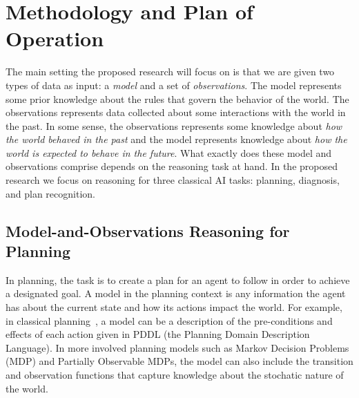 \documentclass[12pt]{article}
\begin{document}
\section{Methodology and Plan of Operation}
\label{sec:methodology}


The main setting the proposed research will focus on is that we are given two types of data as input: 
a {\em model} and a set of {\em observations}. The model represents some prior knowledge about the rules that govern the behavior of the world. The observations represents data collected about some  interactions with the world in the past. 
In some sense, the observations represents some knowledge about {\em how the world behaved in the past} and the model represents knowledge about {\em how the world is expected to behave in the future}. What exactly does these model and observations comprise depends on the reasoning task at hand. In the proposed research we focus on reasoning for three classical AI tasks: planning, diagnosis, and plan recognition. %



\subsection{Model-and-Observations Reasoning for Planning}


In planning, the task is to create a plan for an agent to follow in order to achieve a designated goal. A model in the planning context is any information the agent has about the current state and how its actions impact the world. %
For example, in classical planning~\cite{fikes1971strips}, a model can be a description of the pre-conditions and effects of each action given in PDDL (the Planning Domain Description Language). In more involved planning models such as Markov Decision Problems (MDP) and Partially Observable MDPs, the model can also include the transition and observation functions that capture knowledge about the stochatic nature of the world. 
\end{document}
